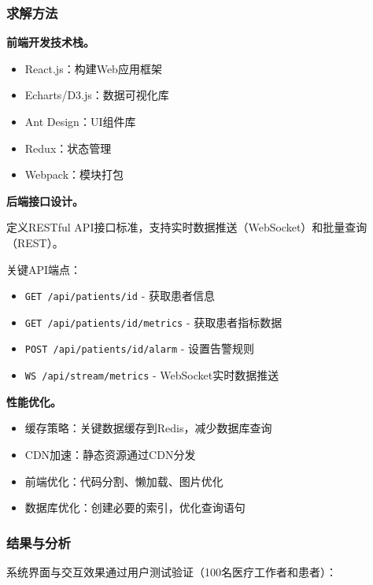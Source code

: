 \subsubsection{求解方法}

\textbf{前端开发技术栈。}
\begin{itemize}[itemindent=2em]
\item React.js：构建Web应用框架
\item Echarts/D3.js：数据可视化库
\item Ant Design：UI组件库
\item Redux：状态管理
\item Webpack：模块打包
\end{itemize}

\textbf{后端接口设计。}

定义RESTful API接口标准，支持实时数据推送（WebSocket）和批量查询（REST）。

关键API端点：
\begin{itemize}[itemindent=2em]
\item \texttt{GET /api/patients/{id}} - 获取患者信息
\item \texttt{GET /api/patients/{id}/metrics} - 获取患者指标数据
\item \texttt{POST /api/patients/{id}/alarm} - 设置告警规则
\item \texttt{WS /api/stream/metrics} - WebSocket实时数据推送
\end{itemize}

\textbf{性能优化。}
\begin{itemize}[itemindent=2em]
\item 缓存策略：关键数据缓存到Redis，减少数据库查询
\item CDN加速：静态资源通过CDN分发
\item 前端优化：代码分割、懒加载、图片优化
\item 数据库优化：创建必要的索引，优化查询语句
\end{itemize}

\subsubsection{结果与分析}

系统界面与交互效果通过用户测试验证（100名医疗工作者和患者）：

